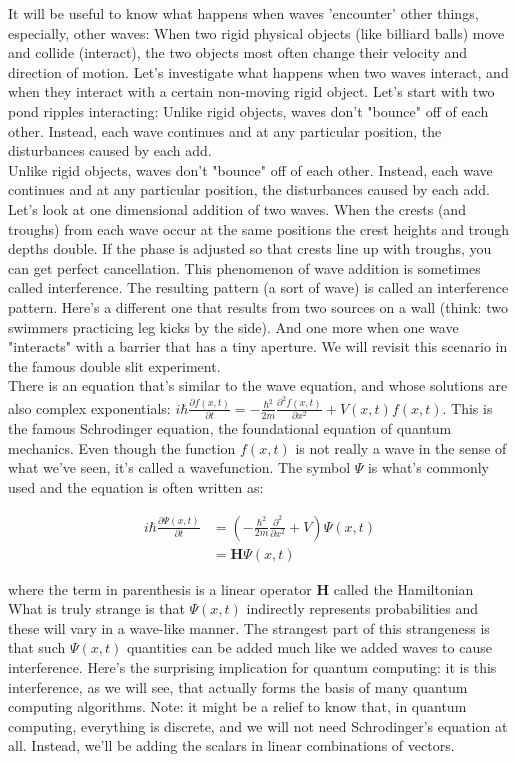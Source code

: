 \documentclass[main.tex]{subfiles}
\begin{document}
It will be useful to know what happens when waves 'encounter' other things, especially, other waves: When two rigid physical objects (like billiard balls) move and collide (interact), the two objects most often change their velocity and direction of motion. Let's investigate what happens when two waves interact, and when they interact with a certain non-moving rigid object. Let's start with two pond ripples interacting: Unlike rigid objects, waves don't "bounce" off of each other. Instead, each wave continues and at any particular position, the disturbances caused by each add.\\

Unlike rigid objects, waves don't "bounce" off of each other.
Instead, each wave continues and at any particular position, the disturbances caused by each add. Let's look at one dimensional addition of two waves. When the crests (and troughs) from each wave occur at the same positions the crest heights and trough depths double. If the phase is adjusted so that crests line up with troughs, you can get perfect cancellation. This phenomenon of wave addition is sometimes called interference. The resulting pattern (a sort of wave) is called an interference pattern. Here's a different one that results from two sources on a wall (think: two swimmers practicing leg kicks by the side). And one more when one wave "interacts" with a barrier that has a tiny aperture. We will revisit this scenario in the famous double slit experiment.\\

There is an equation that's similar to the wave equation, and whose solutions are also complex exponentials: $i \hbar \frac{\partial f(x, t)}{\partial t}=-\frac{\hbar^{2}}{2 m} \frac{\partial^{2} f(x, t)}{\partial x^{2}}+V(x, t) f(x, t)$. This is the famous Schrodinger equation, the foundational equation of quantum mechanics. Even though the function $f(x, t)$ is not really a wave in the sense of what we've seen, it's called a wavefunction. The symbol $\Psi$ is what's commonly used and the equation is often written as:

$$
\begin{aligned}
i \hbar \frac{\partial \Psi(x, t)}{\partial t} &=\left(-\frac{\hbar^{2}}{2 m} \frac{\partial^{2}}{\partial x^{2}}+V\right) \Psi(x, t) \\
&=\mathbf{H} \Psi(x, t)
\end{aligned}
$$

where the term in parenthesis is a linear operator $\mathbf{H}$ called the Hamiltonian
What is truly strange is that $\Psi(x, t)$ indirectly represents probabilities and these will vary in a wave-like manner. The strangest part of this strangeness is that such $\Psi(x, t)$ quantities can be added much like we added waves to cause interference. Here's the surprising implication for quantum computing: it is this interference, as we will see, that actually forms the basis of many quantum computing algorithms. Note: it might be a relief to know that, in quantum computing, everything is discrete, and we will not need Schrodinger's equation at all. Instead, we'll be adding the scalars in linear combinations of vectors.
\end{document}
